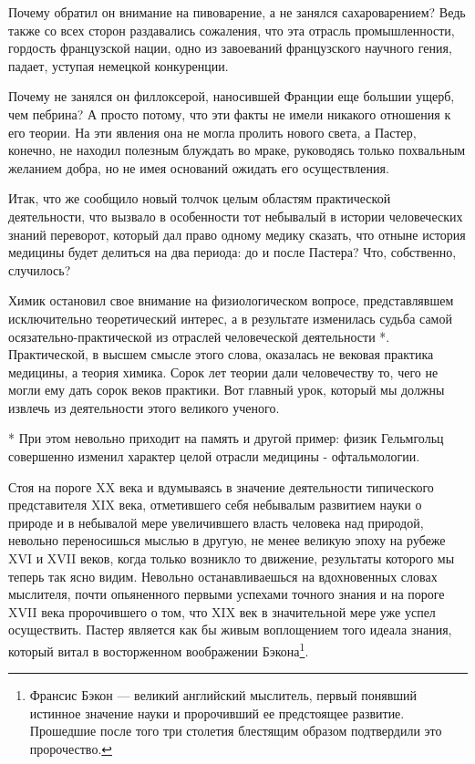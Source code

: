 Почему   обратил   он   внимание   на  пивоварение,   а   не   занялся
сахароварением? Ведь  также со всех сторон  раздавались сожаления, что
эта  отрасль  промышленности,  гордость  французской  нации,  одно  из
завоеваний  французского  научного  гения,  падает,  уступая  немецкой
конкуренции.

Почему  не  занялся он  филлоксерой,  наносившей  Франции еще  большии
ущерб, чем пебрина?  А просто потому, что эти факты  не имели никакого
отношения к  его теории. На  эти явления  она не могла  пролить нового
света,  а Пастер,  конечно,  не находил  полезным  блуждать во  мраке,
руководясь  только похвальным  желанием  добра, но  не имея  оснований
ожидать его осуществления.

Итак,  что  же  сообщило  новый  толчок  целым  областям  практической
деятельности,  что  вызвало  в  особенности тот  небывалый  в  истории
человеческих  знаний  переворот,  который   дал  право  одному  медику
сказать, что отныне история медицины будет делиться на два периода: до
и после Пастера? Что, собственно, случилось?

Химик   остановил   свое    внимание   на   физиологическом   вопросе,
представлявшем  исключительно теоретический  интерес,  а в  результате
изменилась   судьба   самой   осязательно-практической   из   отраслей
человеческой  деятельности  *.  Практической, в  высшем  смысле  этого
слова, оказалась не вековая практика  медицины, а теория химика. Сорок
лет теории  дали человечеству то, чего  не могли ему дать  сорок веков
практики. Вот главный урок, который  мы должны извлечь из деятельности
этого великого ученого.

*  При  этом  невольно  приходит  на память  и  другой  пример:  физик
Гельмгольц  совершенно  изменил  характер  целой  отрасли  медицины  -
офтальмологии.

Стоя  на  пороге   XX  века  и  вдумываясь   в  значение  деятельности
типического  представителя   XIX  века,  отметившего   себя  небывалым
развитием  науки о  природе  и в  небывалой  мере увеличившего  власть
человека над природой, невольно переносишься мыслью в другую, не менее
великую эпоху  на рубеже XVI  и XVII  веков, когда только  возникло то
движение,  результаты  которого мы  теперь  так  ясно видим.  Невольно
останавливаешься на  вдохновенных словах мыслителя,  почти опьяненного
первыми успехами точного  знания и на пороге XVII  века пророчившего о
том, что  XIX век  в значительной мере  уже успел  осуществить. Пастер
является как бы живым воплощением  того идеала знания, который витал в
восторженном  воображении  Бэкона\footnote{Франсис Бэкон  ---  великий
английский  мыслитель,  первый  понявший  истинное  значение  науки  и
пророчивший ее предстоящее развитие. Прошедшие после того три столетия
блестящим образом подтвердили это пророчество.}.

